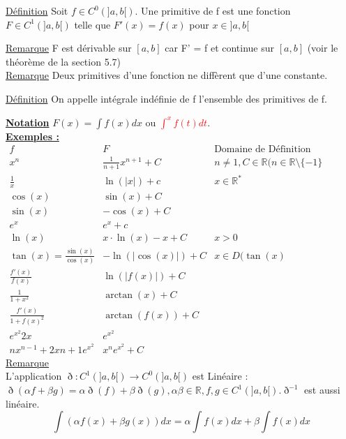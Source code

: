 \documentclass[12pt,a4paper]{article}
\newcommand{\evid}[1]{\textbf{\underline{#1}}}
\newcommand{\R}{\ensuremath{\mathbb{R}} }
\newcommand{\Remarque}{\underline{Remarque} }
\newcommand{\Definition}{\underline{Définition} }
\begin{document}
{\begin{boite}
	\Definition Soit $f\in C^0(]a,b[)$. Une primitive de f est une fonction $F \in C^1(]a,b[)$ telle que $F'(x) = f(x)$ pour $x \in ]a,b[$
\end{boite}
\Remarque F est dérivable sur $[a,b]$ car F' = f et continue sur $[a,b]$ (voir le théorème de la section 5.7)\\
\Remarque Deux primitives d'une fonction ne diffèrent que d'une constante.
\begin{boite}
\Definition On appelle intégrale indéfinie de f l'ensemble des primitives de f.
\end{boite}
\evid{Notation} $F(x) = \int f(x)dx$ ou \textcolor{red}{$\int^x f(t) dt$}.\\
\evid{Exemples :}\\
$\begin{array}{lll}
f & F & \text{Domaine de Définition}\\
\hline
x^n & \frac{1}{n+1}x^{n+1} + C & n\neq 1, C \in \R (n \in \R\setminus\{-1\}\\
\frac{1}{x}& \ln(|x|) + c & x \in \R^* \\
\cos(x) & \sin(x) + C &\\
\sin(x) & -\cos(x) + C &\\
e^x & e^x + c &\\
\ln(x) & x\cdot\ln(x) - x + C & x > 0\\
\tan(x) = \frac{\sin(x)}{\cos(x)} & -\ln(|\cos(x)|) + C & x \in D(\tan(x)\\
\frac{f'(x)}{f(x)} & \ln(|f(x)|) +C\\
\frac{1}{1+x^2} & \arctan(x) + C &\\
\frac{f'(x)}{1+f(x)^2} & \arctan(f(x)) + C &\\
e^{x^2} 2x & e^{x^2} &\\
nx^{n-1}+2x{n+1}e^{x^2} & x^ne^{x^2} + C
\end{array}$\\
\Remarque\\
L'application  $\eth : C^1 (]a,b[) \to C^0 (]a,b[)$ est Linéaire : $\eth(\alpha f + \beta g) = \alpha\eth(f) +  \beta\eth(g), \alpha \beta \in \R, f,g \in C^1 (]a,b[). \eth^{-1}$ est aussi linéaire.
\begin{equation}
 \int(\alpha f(x) + \beta g(x))dx = \alpha \int f(x)dx + \beta\int f(x) dx	
\end{equation}
}
\end{document}
